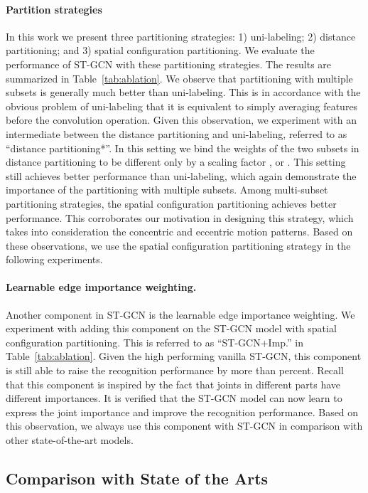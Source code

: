 \documentclass[letterpaper]{article} \usepackage{aaai18}  \usepackage{times}  \usepackage{helvet}  \usepackage{courier}  \usepackage{url}  \usepackage{graphicx}
\begin{document}
\paragraph{Partition strategies}
In this work we present three partitioning strategies: 1) uni-labeling; 2) distance partitioning; and 3) spatial configuration partitioning.
We evaluate the performance of ST-GCN with these partitioning strategies.
The results are summarized in Table~\ref{tab:ablation}.
We observe that partitioning with multiple subsets is generally much better than uni-labeling. 
This is in accordance with the obvious problem of uni-labeling that it is equivalent to simply averaging features before the convolution operation.
Given this observation, we experiment with an intermediate between the distance partitioning and uni-labeling, referred to as ``distance partitioning*''.
In this setting we bind the weights of the two subsets in distance partitioning to be different only by a scaling factor , or .
This setting still achieves better performance than uni-labeling, which again demonstrate the importance of the partitioning with multiple subsets.
Among multi-subset partitioning strategies, the spatial configuration partitioning achieves better performance.
This corroborates our motivation in designing this strategy, which takes into consideration the concentric and eccentric motion patterns.
Based on these observations, we use the spatial configuration partitioning strategy in the following experiments.


\paragraph{Learnable edge importance weighting.}
Another component in ST-GCN is the learnable edge importance weighting. 
We experiment with adding this component on the ST-GCN model with spatial configuration partitioning.
This is referred to as ``ST-GCN+Imp.'' in Table~\ref{tab:ablation}.
Given the high performing vanilla ST-GCN, this component is still able to raise the recognition performance by more than  percent.
Recall that this component is inspired by the fact that joints in different parts have different importances.
It is verified that the ST-GCN model can now learn to express the joint importance and improve the recognition performance.
Based on this observation, we always use this component with ST-GCN in comparison with other state-of-the-art models.


\subsection{Comparison with State of the Arts}
\end{document}
